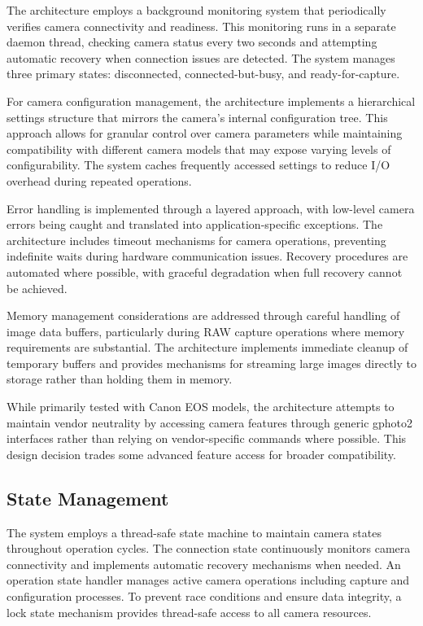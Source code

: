 The architecture employs a background monitoring system that periodically verifies camera connectivity and readiness. This monitoring runs in a separate daemon thread, checking camera status every two seconds and attempting automatic recovery when connection issues are detected. The system manages three primary states: disconnected, connected-but-busy, and ready-for-capture.

For camera configuration management, the architecture implements a hierarchical settings structure that mirrors the camera's internal configuration tree. This approach allows for granular control over camera parameters while maintaining compatibility with different camera models that may expose varying levels of configurability. The system caches frequently accessed settings to reduce I/O overhead during repeated operations.

Error handling is implemented through a layered approach, with low-level camera errors being caught and translated into application-specific exceptions. The architecture includes timeout mechanisms for camera operations, preventing indefinite waits during hardware communication issues. Recovery procedures are automated where possible, with graceful degradation when full recovery cannot be achieved.

Memory management considerations are addressed through careful handling of image data buffers, particularly during RAW capture operations where memory requirements are substantial. The architecture implements immediate cleanup of temporary buffers and provides mechanisms for streaming large images directly to storage rather than holding them in memory.

While primarily tested with Canon EOS models, the architecture attempts to maintain vendor neutrality by accessing camera features through generic gphoto2 interfaces rather than relying on vendor-specific commands where possible. This design decision trades some advanced feature access for broader compatibility.
\subsection{State Management}
The system employs a thread-safe state machine to maintain camera states throughout operation cycles. The connection state continuously monitors camera connectivity and implements automatic recovery mechanisms when needed. An operation state handler manages active camera operations including capture and configuration processes. To prevent race conditions and ensure data integrity, a lock state mechanism provides thread-safe access to all camera resources.

